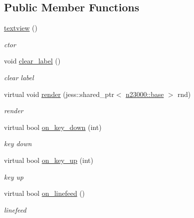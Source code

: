 \subsection*{Public Member Functions}
\begin{DoxyCompactItemize}
\item 
\hyperlink{classnebula_1_1ui_1_1object_1_1textview_a1b6feaaf165e27e9c56ef62ccdc7e0ee}{textview} ()
\begin{DoxyCompactList}\small\item\em ctor \item\end{DoxyCompactList}\item 
void \hyperlink{classnebula_1_1ui_1_1object_1_1textview_af3d558c828f633eaecc15e5c933cf9c3}{clear\_\-label} ()
\begin{DoxyCompactList}\small\item\em clear label \item\end{DoxyCompactList}\item 
virtual void \hyperlink{classnebula_1_1ui_1_1object_1_1textview_af2b39e3d0d5b21d2195682826f483de7}{render} (jess::shared\_\-ptr$<$ \hyperlink{classnebula_1_1platform_1_1renderer_1_1base}{n23000::base} $>$ rnd)
\begin{DoxyCompactList}\small\item\em render \item\end{DoxyCompactList}\end{DoxyCompactItemize}
\begin{Indent}{\bf }\par
{\em \label{_amgrpd41d8cd98f00b204e9800998ecf8427e}
 }\begin{DoxyCompactItemize}
\item 
virtual bool \hyperlink{classnebula_1_1ui_1_1object_1_1textview_a94196ab110d65359fe5721324f0f454d}{on\_\-key\_\-down} (int)
\begin{DoxyCompactList}\small\item\em key down \item\end{DoxyCompactList}\item 
virtual bool \hyperlink{classnebula_1_1ui_1_1object_1_1textview_a00601569990afebe08f582b5fcebde08}{on\_\-key\_\-up} (int)
\begin{DoxyCompactList}\small\item\em key up \item\end{DoxyCompactList}\item 
virtual bool \hyperlink{classnebula_1_1ui_1_1object_1_1textview_a50f65aa34f66c5baada483bb3bbc0360}{on\_\-linefeed} ()
\begin{DoxyCompactList}\small\item\em linefeed \item\end{DoxyCompactList}\end{DoxyCompactItemize}
\end{Indent}
